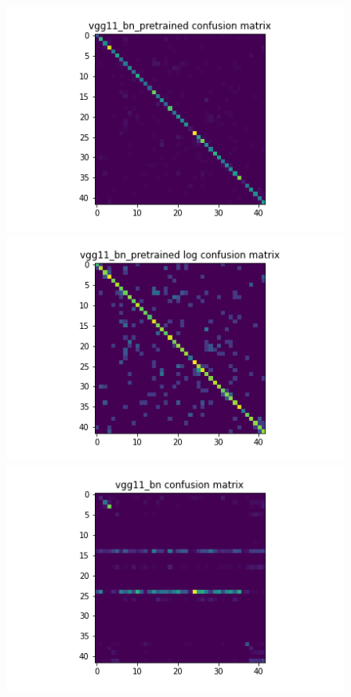 \begin{figure}[H]
  \begin{minipage}[b]{.5\linewidth}
    \centering
    \includegraphics[width=1.2\textwidth]{figs/conf_matrix/vgg11_bn_pretrained_conf.png}
  \end{minipage}
  \hfill
  \begin{minipage}[b]{.5\linewidth}
    \centering
    \includegraphics[width=1.2\textwidth]{figs/conf_matrix/vgg11_bn_pretrained_log_conf.png}
  \end{minipage}
  \vfill
  \begin{minipage}[b]{.5\linewidth}
    \centering
    \includegraphics[width=1.2\textwidth]{figs/conf_matrix/vgg11_bn_conf.png}

\end{minipage}
\end{figure}
